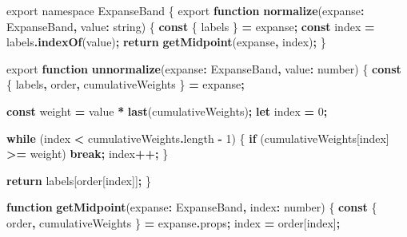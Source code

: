 \documentclass[
]{book}
\newenvironment{Shaded}{\begin{snugshade}}{\end{snugshade}}
\newcommand{\AttributeTok}[1]{\textcolor[rgb]{0.13,0.29,0.53}{#1}}
\newcommand{\ControlFlowTok}[1]{\textcolor[rgb]{0.13,0.29,0.53}{\textbf{#1}}}
\newcommand{\DataTypeTok}[1]{\textcolor[rgb]{0.13,0.29,0.53}{#1}}
\newcommand{\DecValTok}[1]{\textcolor[rgb]{0.00,0.00,0.81}{#1}}
\newcommand{\FunctionTok}[1]{\textcolor[rgb]{0.13,0.29,0.53}{\textbf{#1}}}
\newcommand{\ImportTok}[1]{#1}
\newcommand{\KeywordTok}[1]{\textcolor[rgb]{0.13,0.29,0.53}{\textbf{#1}}}
\newcommand{\NormalTok}[1]{#1}
\newcommand{\OperatorTok}[1]{\textcolor[rgb]{0.81,0.36,0.00}{\textbf{#1}}}
\theoremstyle{definition}
\theoremstyle{definition}
\theoremstyle{definition}
\theoremstyle{definition}
\theoremstyle{remark}
\begin{document}
\begin{Shaded}
\begin{Highlighting}[]
\ImportTok{export} \ImportTok{namespace} \DataTypeTok{ExpanseBand}\NormalTok{ \{}
  \ImportTok{export} \KeywordTok{function} \FunctionTok{normalize}\NormalTok{(expanse}\OperatorTok{:}\NormalTok{ ExpanseBand}\OperatorTok{,}\NormalTok{ value}\OperatorTok{:} \DataTypeTok{string}\NormalTok{) \{}
    \KeywordTok{const}\NormalTok{ \{ labels \} }\OperatorTok{=}\NormalTok{ expanse}\OperatorTok{;}
    \KeywordTok{const}\NormalTok{ index }\OperatorTok{=}\NormalTok{ labels}\OperatorTok{.}\FunctionTok{indexOf}\NormalTok{(value)}\OperatorTok{;}
    \ControlFlowTok{return} \FunctionTok{getMidpoint}\NormalTok{(expanse}\OperatorTok{,}\NormalTok{ index)}\OperatorTok{;}
\NormalTok{  \}}

  \ImportTok{export} \KeywordTok{function} \FunctionTok{unnormalize}\NormalTok{(expanse}\OperatorTok{:}\NormalTok{ ExpanseBand}\OperatorTok{,}\NormalTok{ value}\OperatorTok{:} \DataTypeTok{number}\NormalTok{) \{}
    \KeywordTok{const}\NormalTok{ \{ labels}\OperatorTok{,}\NormalTok{ order}\OperatorTok{,}\NormalTok{ cumulativeWeights \} }\OperatorTok{=}\NormalTok{ expanse}\OperatorTok{;}

    \KeywordTok{const}\NormalTok{ weight }\OperatorTok{=}\NormalTok{ value }\OperatorTok{*} \FunctionTok{last}\NormalTok{(cumulativeWeights)}\OperatorTok{;}
    \KeywordTok{let}\NormalTok{ index }\OperatorTok{=} \DecValTok{0}\OperatorTok{;}

    \ControlFlowTok{while}\NormalTok{ (index }\OperatorTok{\textless{}}\NormalTok{ cumulativeWeights}\OperatorTok{.}\AttributeTok{length} \OperatorTok{{-}} \DecValTok{1}\NormalTok{) \{}
      \ControlFlowTok{if}\NormalTok{ (cumulativeWeights[index] }\OperatorTok{\textgreater{}=}\NormalTok{ weight) }\ControlFlowTok{break}\OperatorTok{;}
\NormalTok{      index}\OperatorTok{++;}
\NormalTok{    \}}

    \ControlFlowTok{return}\NormalTok{ labels[order[index]]}\OperatorTok{;}
\NormalTok{  \}}

  \KeywordTok{function} \FunctionTok{getMidpoint}\NormalTok{(expanse}\OperatorTok{:}\NormalTok{ ExpanseBand}\OperatorTok{,}\NormalTok{ index}\OperatorTok{:} \DataTypeTok{number}\NormalTok{) \{}
    \KeywordTok{const}\NormalTok{ \{ order}\OperatorTok{,}\NormalTok{ cumulativeWeights \} }\OperatorTok{=}\NormalTok{ expanse}\OperatorTok{.}\AttributeTok{props}\OperatorTok{;}
\NormalTok{    index }\OperatorTok{=}\NormalTok{ order[index]}\OperatorTok{;}


\end{Highlighting}
\end{Shaded}
\end{document}
